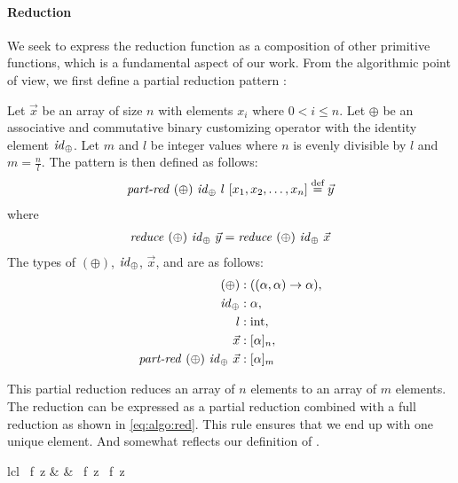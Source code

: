 \paragraph{Reduction}
We seek to express the reduction function as a composition of other primitive functions, which is a fundamental aspect of our work.
From the algorithmic point of view, we first define a partial reduction pattern \partRed:
\begin{definition}
  \label{definition:pattern:parReduce}
  Let $\vec{x}$ be an array of size $n$ with elements $x_i$ where $0 < i \leq n$.
  Let $\oplus$ be an associative and commutative binary customizing operator with the identity element $\text{\textit{id}}_\oplus$.
  Let $m$ and $l$ be integer values where $n$ is evenly divisible by $l$ and $m = \frac{n}{l}$.
  The \partRed pattern is then defined as follows:
  \begin{align*}
    \text{\textit{part-red}}\ (\oplus)\ \text{\textit{id}}_\oplus\ l\ [x_1, x_2, \dots, x_n] \stackrel{\textrm{\scriptsize def}}{=} \vec{y}
  \end{align*}
  where
  \begin{align*}
    \reduce\ (\oplus)\ \id_\oplus\ \vec{y} = \reduce\ (\oplus)\ \id_\oplus\ \vec{x}
  \end{align*}
  The types of $(\oplus)$, $\text{\textit{id}}_\oplus$, $\vec{x}$, and \partRed are as follows:
  \begin{align*}
    (\oplus) &: ((\alpha, \alpha) \rightarrow \alpha),\\
    \text{\textit{id}}_\oplus &: \alpha,\\
    l &: \text{int},\\
    \vec{x} &: [\alpha]_n,\\
    \text{\textit{part-red}}\ (\oplus)\ \text{\textit{id}}_\oplus\ \vec{x} &: [\alpha]_m
  \end{align*}
\end{definition}
\noindent
This partial reduction reduces an array of $n$ elements to an array of $m$ elements.
The reduction can be expressed as a partial reduction combined with a full reduction as shown in \autoref{eq:algo:red}.
This rule ensures that we end up with one unique element.
And somewhat reflects our definition of \partRed.
%
\begin{rerule}{lcl}
  \reduce\ f\ z
    & \rightarrow &
      \reduce\ f\ z \circ \partRed\ f\ z
  \label{eq:algo:red}
\end{rerule}

